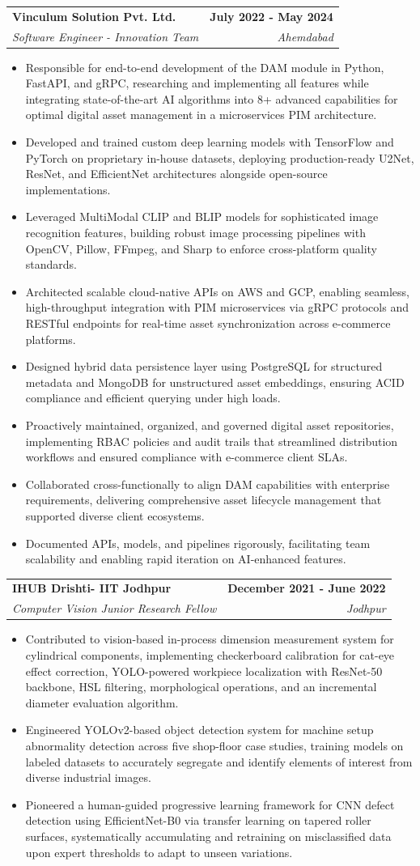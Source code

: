 \documentclass[letterpaper,11pt]{article}
\makeatletter
\newcommand{\resumeItem}[1]{
  \item\small{
    {#1 \vspace{-2pt}}
  }
}
\newcommand{\resumeSubheading}[4]{
  \vspace{-2pt}\item
    \begin{tabular*}{1.0\textwidth}[t]{l@{\extracolsep{\fill}}r}
      \textbf{#1} & \textbf{\small #2} \\
      \textit{\small#3} & \textit{\small #4} \\
    \end{tabular*}\vspace{-7pt}
}
\newcommand{\resumeItemListStart}{\begin{itemize}}
\newcommand{\resumeItemListEnd}{\end{itemize}\vspace{-5pt}}
\makeatother
\begin{document}
    \resumeSubheading
      {Vinculum Solution Pvt. Ltd. }{July 2022 - May 2024}
      {Software Engineer - Innovation Team}{Ahemdabad}
      \resumeItemListStart
        \resumeItem{Responsible for end-to-end development of the DAM module in Python, FastAPI, and gRPC, researching and implementing all features while integrating state-of-the-art AI algorithms into 8+ advanced capabilities for optimal digital asset management in a microservices PIM architecture.}
        \resumeItem{Developed and trained custom deep learning models with TensorFlow and PyTorch on proprietary in-house datasets, deploying production-ready U2Net, ResNet, and EfficientNet architectures alongside open-source implementations.}
        \resumeItem{Leveraged MultiModal CLIP and BLIP models for sophisticated image recognition features, building robust image processing pipelines with OpenCV, Pillow, FFmpeg, and Sharp to enforce cross-platform quality standards.}
        \resumeItem{Architected scalable cloud-native APIs on AWS and GCP, enabling seamless, high-throughput integration with PIM microservices via gRPC protocols and RESTful endpoints for real-time asset synchronization across e-commerce platforms.}
        \resumeItem{Designed hybrid data persistence layer using PostgreSQL for structured metadata and MongoDB for unstructured asset embeddings, ensuring ACID compliance and efficient querying under high loads.}
        \resumeItem{Proactively maintained, organized, and governed digital asset repositories, implementing RBAC policies and audit trails that streamlined distribution workflows and ensured compliance with e-commerce client SLAs.}
        \resumeItem{Collaborated cross-functionally to align DAM capabilities with enterprise requirements, delivering comprehensive asset lifecycle management that supported diverse client ecosystems.}
        \resumeItem{Documented APIs, models, and pipelines rigorously, facilitating team scalability and enabling rapid iteration on AI-enhanced features.}
        
      \resumeItemListEnd

    \resumeSubheading
      {IHUB Drishti- IIT Jodhpur}{December 2021 - June 2022}
      {Computer Vision Junior Research Fellow}{Jodhpur}
      \resumeItemListStart
        \resumeItem{Contributed to vision-based in-process dimension measurement system for cylindrical components, implementing checkerboard calibration for cat-eye effect correction, YOLO-powered workpiece localization with ResNet-50 backbone, HSL filtering, morphological operations, and an incremental diameter evaluation algorithm.}
        \resumeItem{Engineered YOLOv2-based object detection system for machine setup abnormality detection across five shop-floor case studies, training models on labeled datasets to accurately segregate and identify elements of interest from diverse industrial images.}
        \resumeItem{Pioneered a human-guided progressive learning framework for CNN defect detection using EfficientNet-B0 via transfer learning on tapered roller surfaces, systematically accumulating and retraining on misclassified data upon expert thresholds to adapt to unseen variations.}
    \resumeItemListEnd
    
\end{document}
